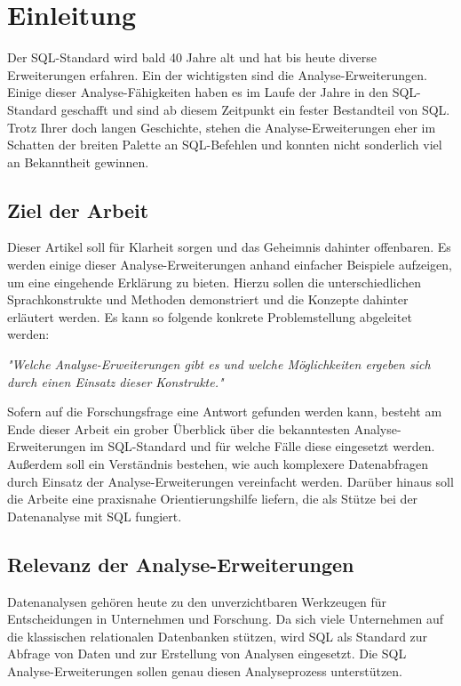 \chapter{Einleitung}
\label{chap:einleitung} Der SQL-Standard wird bald 40 Jahre alt und hat bis heute
diverse Erweiterungen erfahren. Ein der wichtigsten sind die Analyse-Erweiterungen.
Einige dieser Analyse-Fähigkeiten haben es im Laufe der Jahre in den SQL-Standard
geschafft und sind ab diesem Zeitpunkt ein fester Bestandteil von SQL. Trotz
Ihrer doch langen Geschichte, stehen die Analyse-Erweiterungen eher im Schatten der
breiten Palette an SQL-Befehlen und konnten nicht sonderlich viel an Bekanntheit
gewinnen.


\section{Ziel der Arbeit}
\label{sec:ziel_der_arbeit} Dieser Artikel soll für Klarheit sorgen und das
Geheimnis dahinter offenbaren. Es werden einige dieser Analyse-Erweiterungen anhand
einfacher Beispiele aufzeigen, um eine eingehende Erklärung zu bieten. Hierzu sollen
die unterschiedlichen Sprachkonstrukte und Methoden demonstriert und die Konzepte
dahinter erläutert werden. Es kann so folgende konkrete Problemstellung
abgeleitet werden:
\begin{center}
	\textit{"Welche Analyse-Erweiterungen gibt es und welche Möglichkeiten ergeben
	sich durch einen Einsatz dieser Konstrukte."}
\end{center}
Sofern auf die Forschungsfrage eine Antwort gefunden werden kann, besteht am
Ende dieser Arbeit ein grober Überblick über die bekanntesten Analyse-Erweiterungen
im SQL-Standard und für welche Fälle diese eingesetzt werden. Außerdem soll ein Verständnis
bestehen, wie auch komplexere Datenabfragen durch Einsatz der Analyse-Erweiterungen
vereinfacht werden. Darüber hinaus soll die Arbeite eine praxisnahe Orientierungshilfe
liefern, die als Stütze bei der Datenanalyse mit SQL fungiert.


\section{Relevanz der Analyse-Erweiterungen}
\label{sec:relevant} Datenanalysen gehören heute zu den unverzichtbaren Werkzeugen
für Entscheidungen in Unternehmen und Forschung. Da sich viele Unternehmen auf
die klassischen relationalen Datenbanken stützen, wird SQL als Standard zur Abfrage
von Daten und zur Erstellung von Analysen eingesetzt. Die SQL Analyse-Erweiterungen
sollen genau diesen Analyseprozess unterstützen.

